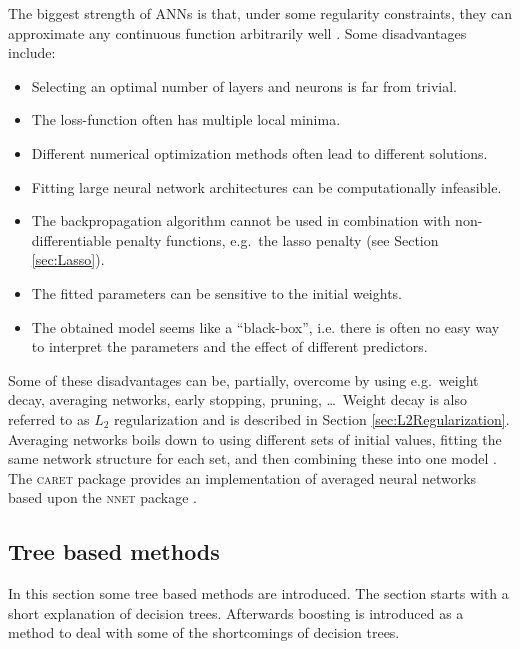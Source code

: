 The biggest strength of ANNs is that, under some regularity constraints, they can approximate any continuous function arbitrarily well \parencite{hornik_multilayer_1989}. Some disadvantages include:
\begin{itemize}
\item Selecting an optimal number of layers and neurons is far from trivial.
\item The loss-function often has multiple local minima.
\item Different numerical optimization methods often lead to different solutions.
\item Fitting large neural network architectures can be computationally infeasible.
\item The backpropagation algorithm cannot be used in combination with non-differentiable penalty functions, e.g.\ the lasso penalty (see Section \ref{sec:Lasso}).
\item The fitted parameters can be sensitive to the initial weights.
\item The obtained model seems like a ``black-box'', i.e. there is often no easy way to interpret the parameters and the effect of different predictors.
\end{itemize}
Some of these disadvantages can be, partially, overcome by using e.g.\ weight decay, averaging networks, early stopping, pruning, \dots\ Weight decay is also referred to as $L_2$ regularization and is described in Section \ref{sec:L2Regularization}. Averaging networks boils down to using different sets of initial values, fitting the same network structure for each set, and then combining these into one model \parencite{ripley_pattern_2009}. The \textsc{caret} package \parencite{caret} provides an implementation of averaged neural networks based upon the \textsc{nnet} package \parencite{nnet}.


\subsection{Tree based methods}
In this section some tree based methods are introduced.  The section starts with a short explanation of decision trees. Afterwards boosting is introduced as a method to deal with some of the shortcomings of decision trees.

